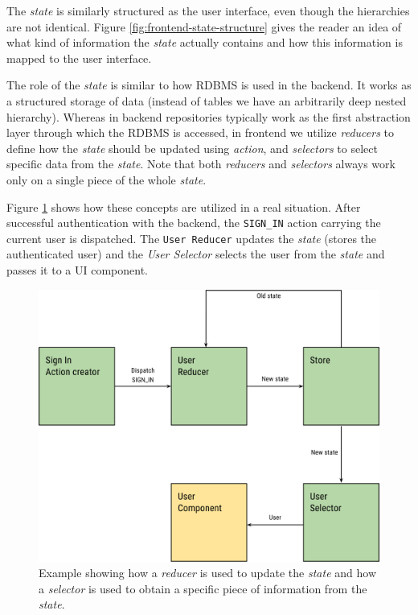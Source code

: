 The \emph{state} is similarly structured as the user interface, even though the hierarchies are not identical. Figure \ref{fig:frontend-state-structure} gives the reader an idea of what kind of information the \emph{state} actually contains and how this information is mapped to the user interface. 

The role of the \emph{state} is similar to how RDBMS is used in the backend. It works as a structured storage of data (instead of tables we have an arbitrarily deep nested hierarchy). Whereas in backend repositories typically work as the first abstraction layer through which the RDBMS is accessed, in frontend we utilize \emph{reducers} to define how the \emph{state} should be updated using \emph{action}, and \emph{selectors} to select specific data from the \emph{state}. Note that both \emph{reducers} and \emph{selectors} always work only on a single piece of the whole \emph{state}.

Figure \ref{fig:frontend-reducer-and-selector} shows how these concepts are utilized in a real situation. After successful authentication with the backend, the \texttt{SIGN\_IN} action carrying the current user is dispatched. The \texttt{User Reducer} updates the \emph{state} (stores the authenticated user) and the \emph{User Selector} selects the user from the \emph{state} and passes it to a UI component.
\begin{figure}
	\centering
	\includegraphics[width=120mm]{img/04_frontend_reducer_and_selector.png}
	\caption{Example showing how a \emph{reducer} is used to update the \emph{state} and how a \emph{selector} is used to obtain a specific piece of information from the \emph{state}.} 
	\label{fig:frontend-reducer-and-selector}
\end{figure}

